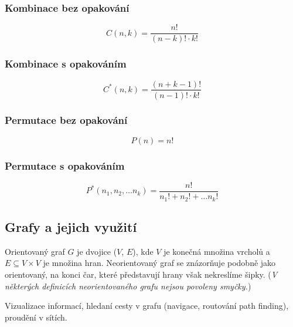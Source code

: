 \subsubsection{Kombinace bez opakování}
\begin{equation}
C(n,k) = \frac{n!}{(n-k)!\cdot k!}
\end{equation}
\subsubsection{Kombinace s opakováním}
\begin{equation}
C^*(n,k) = \frac{(n+k-1)!}{(n-1)!\cdot k!}
\end{equation}
\subsubsection{Permutace bez opakování}
\begin{equation}
P(n) = n!
\end{equation}
\subsubsection{Permutace s opakováním}
\begin{equation}
P^*(n_1, n_2, \ldots n_k) = \frac{n!}{n_1!+n_2!+\ldots n_k!}
\end{equation}
\subsection{Grafy a jejich využití}
Orientovaný graf $G$ je dvojice ($V$, $E$), kde $V$ je konečná množina vrcholů a $E \subseteq V\times V$ je množina hran.
Neorientovaný graf se znázorňuje podobně jako orientovaný, na konci čar, které představují hrany však nekreslíme šipky.
(\textit{V některých definicích neorientovaného grafu nejsou povoleny smyčky.})

Vizualizace informací, hledaní cesty v grafu (navigace, routování path finding), proudění v sítích.